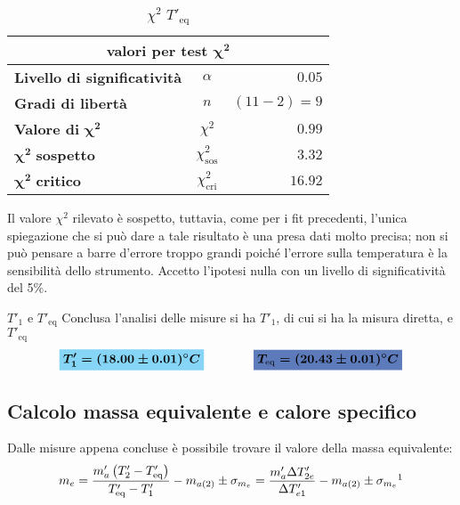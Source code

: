 \documentclass{article}
\newcommand{\azzurro}[1]{\colorbox{mylightblue}{$\displaystyle #1$}}
\newcommand{\blu}[1]{\colorbox{myblue}{$\displaystyle #1$}}
\begin{document}
	
	\begin{table}[H] \centering
		\begin{small}
			\begin{tabular}{@{}lcr@{}}\toprule
				\multicolumn{3}{c}{\textbf{valori per test} \(\boldsymbol{\chi^2}\)}\\ \midrule
				\textbf{Livello di significatività}		 &  \(\alpha\) &\(0.05\) \\  \hdashline
				\textbf{Gradi di libertà}		 & \(n\)  &\((11-2) = 9\) \\   \hdashline
				\textbf{Valore di} \(\boldsymbol{\chi^2}\)	 & \(\chi^2\)  &\(0.99\)\\  \hdashline
				\(\boldsymbol{\chi^2}\) \textbf{sospetto}		& \(\chi^2_{\text{sos}}\)  &\(3.32\)\\ \hdashline
				\(\boldsymbol{\chi^2}\) \textbf{critico}		& \(\chi^2_{\text{cri}}\)  &\(16.92\)\\ 
				\bottomrule
			\end{tabular}
		\end{small}
		\caption{\(\chi^2\) \(T'_{\text{eq}}\)}
	\end{table}
	
	\noindent
	Il valore \(\chi^2\) rilevato è sospetto, tuttavia, come per i fit precedenti, l'unica spiegazione che si può dare a tale risultato è una presa dati molto precisa; non si può pensare a barre d'errore troppo grandi poiché l'errore sulla temperatura è la sensibilità dello strumento. Accetto l'ipotesi nulla con un livello di significatività del 5\%.
	
	
	\begin{es}{\(T'_{1}\) e \(T'_{\text{eq}}\)}
		Conclusa l'analisi delle misure si ha \(T'_{1}\), di cui si ha la misura diretta, e \(T'_{\text{eq}}\)
		\[ 
		\azzurro{\boldsymbol{T'_{1} = (18.00 \pm 0.01)^\circ C}}\qquad \qquad \blu{\boldsymbol{T_{\text{eq}} = (20.43 \pm 0.01)^\circ C}}
		\]
	\end{es}
	
	
	\subsection{Calcolo massa equivalente e calore specifico}\label{calcolo me e cx}
	Dalle misure appena concluse è possibile trovare il valore della massa equivalente:
	\[ 
	m_{e} = \frac{m'_{a}\left(T'_{2} - T'_{\text{eq}}\right)}{T'_{\text{eq}} - T'_{1}} - m_{a(2)} \pm \sigma_{m_e} =  \frac{m'_{a}\Delta T'_{2e}}{\Delta T'_{e1}} - m_{a(2)}\pm \sigma_{m_e} \footnotemark\footnotetext{\label{errore in appendice}Lo sviluppo dell'errore di \(m_{e}\) e di \(c_{x}\) è riportato in appendice (\ref{sigma me})}
	\]
	
\end{document}
